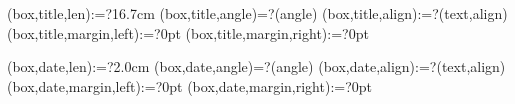 \spine(box,title,len):=?{16.7cm}
\spine(box,title,angle)=?{\thespine(angle)}
\spine(box,title,align):=?{\thespine(text,align)}
\spine(box,title,margin,left):=?{0pt}
\spine(box,title,margin,right):=?{0pt}

\spine(box,date,len):=?{2.0cm}
\spine(box,date,angle)=?{\thespine(angle)}
\spine(box,date,align):=?{\thespine(text,align)}
\spine(box,date,margin,left):=?{0pt}
\spine(box,date,margin,right):=?{0pt}



\newif\ifisdim
\newcommand{\@setifisdim}[1]{%
  \StrLeft{#1}{1}[\@dimleft]%
  \StrRight{#1}{1}[\@dimright]%
  \IfInteger{\@dimleft}{%
    \IfInteger{\@dimright}{%
      \isdimfalse%
    }{%
      \isdimtrue%
    }%
  }{%
    \isdimfalse%
  }%
}
\newcommand{\IfIsDim}[3]{%
  \@setifisdim{#1}%
  \ifisdim#2\else#3\fi%
}

%

\newdimen\@spinelen  %
\newcommand{\@checkspinelen}[1][\paperheight]{%
  \@tempdima=\thespine(margin,left)\relax%
  \@tempdimb=\thespine(margin,right)\relax%
  \DEBUG{SPINELEN MARGIN [left] = \the\@tempdima}%
  \DEBUG{SPINELEN MARGIN [right] = \the\@tempdimb}%
  \@tempdima=\dimexpr\@tempdima+\@tempdimb\relax%
  \DEBUG{SPINELEN ACCUMULATED = \the\@tempdima}%
  \StrCount{\thespine(order)}{,}[\@nBoxSep]%
  \@for\myi:=\expanded{\thespine(order)}\do{%
    \DEBUG{SPINELEN BOXLEN [\myi]}%
    \@tempdimb=\thespine(box,\myi,len)\relax%
    \DEBUG{SPINELEN BOXLEN [\myi] = \the\@tempdimb}%
    \@tempdima=\dimexpr\@tempdima+\@tempdimb\relax%
    \DEBUG{SPINELEN ACCUMULATED = \the\@tempdima}%
  }
  \DEBUG{SPINELEN MAX = \the#1}%
  \@spinelen=\@tempdima%
}


\newcommand{\@reverelist}[2]{%
  \def\@rvstmp{}%
  \@for\myi:={#1}\do{%
    \epreto\@rvstmp{,\myi}%
  }%
  \edef\@rvstmp{\expandafter\@gobble\@rvstmp}%
  \edef#2{\@rvstmp}%
}


\providecommand*{\DivideLengths}[2]{%
  \strip@pt\dimexpr\number\numexpr\number\dimexpr#1\relax*65536/\number\dimexpr#2\relax\relax sp\relax
}


